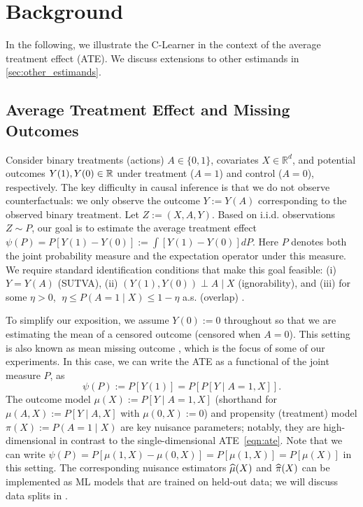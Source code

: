 \section{Background}\label{sec:background}
In the following, we illustrate the C-Learner in the context of the average treatment effect (ATE). We discuss extensions to other estimands in  \cref{sec:other_estimands}.

\subsection{Average Treatment Effect and Missing Outcomes}
\label{sec:ate}

 Consider binary treatments (actions) $A\in\{0,1\}$, covariates $X\in \mathbb R^d$, and potential outcomes $Y(1), Y(0)\in \mathbb{R}$ under treatment ($A=1$) and control ($A=0$), respectively. 
The key difficulty in causal inference is that we do not observe counterfactuals:  
we only observe the outcome $Y := Y(A)$ corresponding to the observed binary treatment. %
Let $Z:=(X,A,Y)$. Based on i.i.d. observations $Z \sim P$, our goal is to estimate the average treatment effect $\psi(P) = P[Y(1) - Y(0)]:=\int [Y(1) - Y(0)]dP$. Here $P$ denotes both the joint probability measure and the expectation operator under this measure. %
We require standard identification conditions that make this goal feasible: 
(i) $Y=Y(A)$ (SUTVA), (ii) $(Y(1),Y(0))\perp A \mid X$ (ignorability), and (iii) for some $\eta>0$, $\;\eta\leq P(A=1\mid X)\leq 1-\eta$ a.s. (overlap) \citep{ding2023course}. 


To simplify our exposition, we assume $Y(0):=0$ throughout so that we are estimating the mean of a censored outcome (censored when $A=0$). 
This setting is also known as mean missing outcome \citep{Kennedy22}, which is the focus of some of our experiments. In this case, we can write the ATE as a functional of the joint measure $P$, as
\begin{equation}
    \label{eqn:ate}
\psi(P) := P[Y(1)]=P\left[P[Y\mid A=1, X]\right].
\end{equation}
The outcome model $\mu(X):=P[Y\mid A=1, X]$ (shorthand for $\mu(A,X):=P[Y\mid A, X]$ with $\mu(0,X):=0$)
and propensity (treatment) model $\pi(X) := P(A=1\mid X)$ are key nuisance parameters; notably, they are high-dimensional in contrast to the single-dimensional ATE~\eqref{eqn:ate}. 
Note that we can write $\psi(P)=P[\mu(1,X)-\mu(0,X)]=P[\mu(1,X)]=P[\mu(X)]$ in this setting. 
The corresponding nuisance estimators $\widehat{\mu}(X)$ and $\widehat{\pi}(X)$ can be implemented as ML models that are trained on held-out data; we will discuss data splits in . %

